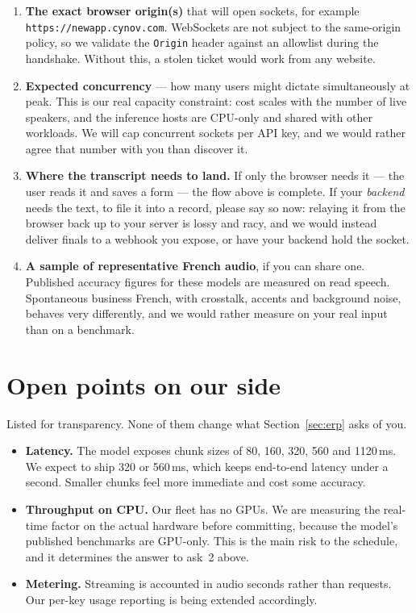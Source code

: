 \documentclass[11pt,a4paper]{article}
\begin{document}
\begin{askbox}
\begin{enumerate}
  \item \textbf{The exact browser origin(s)} that will open sockets, for example
        \texttt{https://newapp.cynov.com}. WebSockets are not subject to the same-origin
        policy, so we validate the \texttt{Origin} header against an allowlist during the
        handshake. Without this, a stolen ticket would work from any website.
  \item \textbf{Expected concurrency} --- how many users might dictate simultaneously at
        peak. This is our real capacity constraint: cost scales with the number of live
        speakers, and the inference hosts are CPU-only and shared with other workloads. We
        will cap concurrent sockets per API key, and we would rather agree that number
        with you than discover it.
  \item \textbf{Where the transcript needs to land.} If only the browser needs it --- the
        user reads it and saves a form --- the flow above is complete. If your
        \emph{backend} needs the text, to file it into a record, please say so now:
        relaying it from the browser back up to your server is lossy and racy, and we
        would instead deliver finals to a webhook you expose, or have your backend hold
        the socket.
  \item \textbf{A sample of representative French audio}, if you can share one. Published
        accuracy figures for these models are measured on read speech. Spontaneous
        business French, with crosstalk, accents and background noise, behaves very
        differently, and we would rather measure on your real input than on a benchmark.
\end{enumerate}
\end{askbox}

\section{Open points on our side}

Listed for transparency. None of them change what Section~\ref{sec:erp} asks of you.

\begin{itemize}
  \item \textbf{Latency.} The model exposes chunk sizes of 80, 160, 320, 560 and
        1120\,ms. We expect to ship 320 or 560\,ms, which keeps end-to-end latency under
        a second. Smaller chunks feel more immediate and cost some accuracy.
  \item \textbf{Throughput on CPU.} Our fleet has no GPUs. We are measuring the real-time
        factor on the actual hardware before committing, because the model's published
        benchmarks are GPU-only. This is the main risk to the schedule, and it determines
        the answer to ask~2 above.
  \item \textbf{Metering.} Streaming is accounted in audio seconds rather than requests.
        Our per-key usage reporting is being extended accordingly.
\end{itemize}
\end{document}
